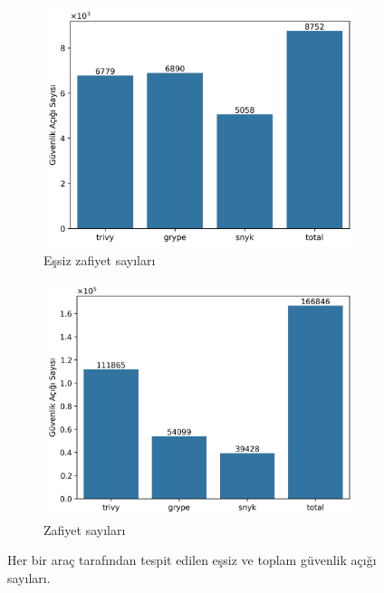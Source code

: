\begin{figure}[!htbp]
	\centering
	\begin{subfigure}[]{\linewidth/2}
		\includegraphics[width=\linewidth]{images/s1/vulCountsUniq.png}
		\caption{Eşsiz zafiyet sayıları}\label{fig:vulCountsUniq}
	\end{subfigure}%
	\begin{subfigure}[]{\linewidth/2}
		\includegraphics[width=\linewidth]{images/s1/vulCountsAll.png}
		\caption{Zafiyet sayıları}\label{fig:vulCountsAll}
	\end{subfigure}

	\caption{Her bir araç tarafından tespit edilen eşsiz ve toplam güvenlik açığı sayıları.}\label{fig:fig1}
\end{figure}

